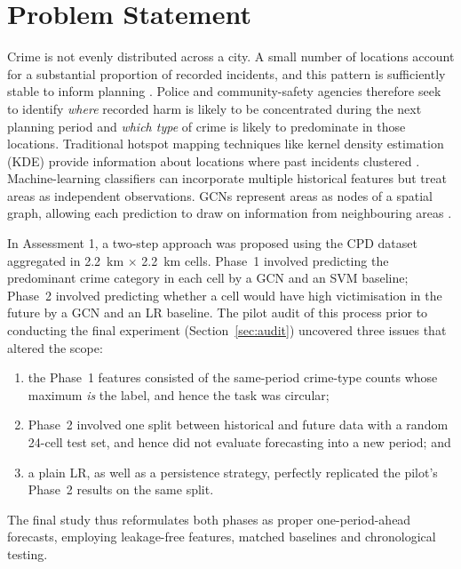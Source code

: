 \documentclass[11pt,a4paper]{report}
\begin{document}
\section{Problem Statement}
Crime is not evenly distributed across a city. A small number of locations account for a substantial proportion of recorded incidents, and this pattern is sufficiently stable to inform planning \citep{weisburd2015}. Police and community-safety agencies therefore seek to identify \emph{where} recorded harm is likely to be concentrated during the next planning period and \emph{which type} of crime is likely to predominate in those locations. Traditional hotspot mapping techniques like kernel density estimation (KDE) provide information about locations where past incidents clustered \citep{chainey2008}. Machine-learning classifiers can incorporate multiple historical features but treat areas as independent observations. GCNs represent areas as nodes of a spatial graph, allowing each prediction to draw on information from neighbouring areas  \citep{kipf2017,zubair2025}.

In Assessment 1, a two-step approach was proposed using the CPD dataset aggregated in 2.2~km $\times$ 2.2~km cells. Phase~1 involved predicting the predominant crime category in each cell by a GCN and an SVM baseline; Phase~2 involved predicting whether a cell would have high victimisation in the future by a GCN and an LR baseline. The pilot audit of this process prior to conducting the final experiment (Section~\ref{sec:audit}) uncovered three issues that altered the scope:

\begin{enumerate}
\item the Phase~1 features consisted of the same-period crime-type counts whose maximum \emph{is} the label, and hence the task was circular;
\item Phase~2 involved one split between historical and future data with a random 24-cell test set, and hence did not evaluate forecasting into a new period; and
\item a plain LR, as well as a persistence strategy, perfectly replicated the pilot's Phase~2 results on the same split.
\end{enumerate}
The final study thus reformulates both phases as proper one-period-ahead forecasts, employing leakage-free features, matched baselines and chronological testing.
\end{document}

